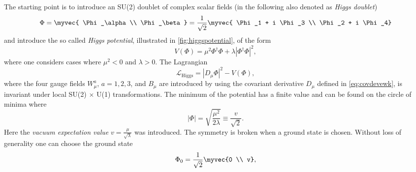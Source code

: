 
The starting point is to introduce an SU(2) doublet of complex scalar fields (in the following also denoted as \emph{Higgs doublet})
\begin{equation}
  \Phi = \myvec{ \Phi_\alpha \\ \Phi_\beta } = \frac{1}{\sqrt{2}} \myvec { \Phi_1 + i \Phi_3 \\ \Phi_2 + i \Phi_4}
\end{equation}
and introduce the so called \emph{Higgs potential}, illustrated in \cref{fig:higgspotential}, of the form
\begin{equation}
  V(\Phi) = \mu^2\Phi^\dagger\Phi + \lambda \left| \Phi^\dagger\Phi \right|^2,
  \label{eq:higgspotential}
\end{equation}
where one considers cases where $\mu^2 < 0$ and $\lambda > 0$.
The Lagrangian 
\begin{equation}
  \mathcal{L}_{\text{Higgs}} = |D_\mu\Phi|^2 - V(\Phi), %
  \label{eq:lagrangianhiggs}
\end{equation}
where the four gauge fields $W_\mu^a$, $a = 1, 2, 3$, and $B_\mu$ are introduced by using the covariant derivative $D_\mu$ defined in \cref{eq:covdevewk}, is invariant under local SU(2) $\times$ U(1) transformations.
The minimum of the potential has a finite value and can be found on the circle of minima where
\begin{equation}
  |\Phi| = \sqrt{ \frac{\mu^2}{2\lambda} } \equiv \frac{ v }{\sqrt{2}}.
  \label{eq:higgsminima}
\end{equation}
Here the \emph{vacuum expectation value} $v = \frac{\mu}{\sqrt{\lambda}}$ was introduced.
The symmetry is broken when a ground state is chosen. 
Without loss of generality one can choose the ground state
\begin{equation}
  \Phi_0 = \frac{1}{\sqrt{2}} \myvec{0 \\ v},
  \label{eq:groundstate}
\end{equation}
